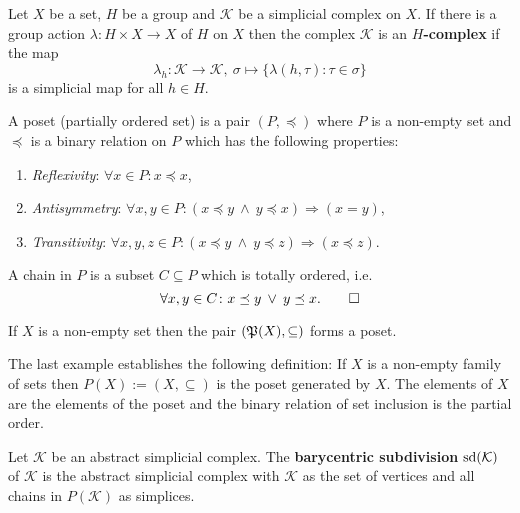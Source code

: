 \begin{defin}
    Let $X$ be a set, $H$ be a group and $\mathcal{K}$ be a simplicial complex on $X$. If there is a 
    group action $\lambda \colon H \times X \to X$ of $H$ on $X$ then
    the complex $\mathcal{K}$ is an \textbf{$H$-complex} if the map
    \begin{equation*}
        \lambda_h \colon \mathcal{K} \to \mathcal{K}, \: \sigma \mapsto \{ \lambda(h, \tau)\colon \tau \in \sigma \}
    \end{equation*}
    is a simplicial map for all $h \in H$.
\end{defin}

\begin{defin}
    A poset (partially ordered set) is a pair $(P, \preceq)$ where 
    $P$ is a non-empty set and 
    $\preceq$ is a binary relation on $P$ which has the following properties:
    \begin{enumerate}
        \item \textit{Reflexivity}: $\forall x \in P\colon x \preceq x$,
        \item \textit{Antisymmetry}: $\forall x, y \in P\colon (x \preceq y \: \land \: y \preceq x) \Rightarrow (x = y)$,
        \item \textit{Transitivity}: $\forall x, y, z \in P\colon (x \preceq y \: \land \: y \preceq z) \Rightarrow (x \preceq z)$.
    \end{enumerate}
    A chain in $P$ is a subset $C \subseteq P$ which is totally ordered, i.e.
    \begin{equation*}
        \forall x, y \in C\colon x \preceq y \: \lor \: y \preceq x. \qedhere
    \end{equation*}
\end{defin}

\begin{ex}
    If $X$ is a non-empty set then the pair $(\mathfrak{P}(X), \subseteq)$ forms a poset.
\end{ex}

The last example establishes the following definition:
If $X$ is a non-empty family of sets then $P(X) := (X, \subseteq)$ is the poset generated by $X$. The elements of $X$
are the elements of the poset and the binary relation of set inclusion is the partial order.

\begin{defin}
    Let $\mathcal{K}$ be an abstract simplicial complex. The \textbf{barycentric subdivision} ${\rm sd}(\mathcal{K})$ of $\mathcal{K}$
    is the abstract simplicial complex with $\mathcal{K}$ as the set of vertices and all chains in $P(\mathcal{K})$ as simplices.
\end{defin}

